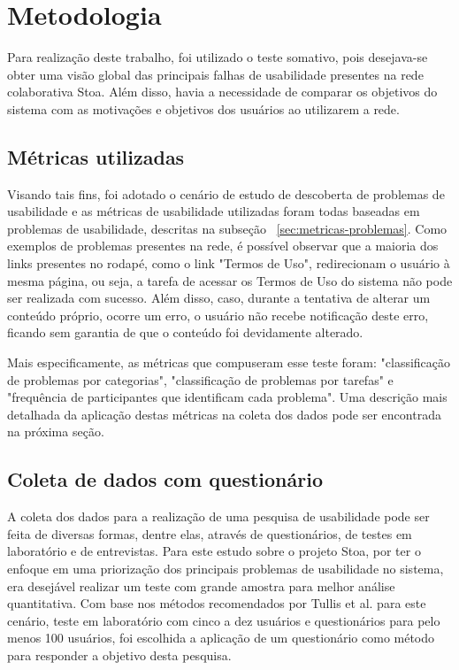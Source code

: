 \chapter{Metodologia}
\label{cap:metodologia}

	Para realização deste trabalho, foi utilizado o teste somativo, pois desejava-se obter uma visão global das principais falhas de usabilidade presentes na rede colaborativa Stoa. Além disso, havia a necessidade de comparar os objetivos do sistema com as motivações e objetivos dos usuários ao utilizarem a rede. 

\section{Métricas utilizadas}
\label{sec:metricas-usadas}

	Visando tais fins, foi adotado o cenário de estudo de descoberta de problemas de usabilidade \cite{tullis:13} e as métricas de usabilidade utilizadas foram todas baseadas em problemas de usabilidade, descritas na subseção ~\ref{sec:metricas-problemas}. Como exemplos de problemas presentes na rede, é possível observar que a maioria dos links presentes no rodapé, como o link "Termos de Uso", redirecionam o usuário à mesma página, ou seja, a tarefa de acessar os Termos de Uso do sistema não pode ser realizada com sucesso. Além disso, caso, durante a tentativa de alterar um conteúdo próprio, ocorre um erro, o usuário não recebe notificação deste erro, ficando sem garantia de que o conteúdo foi devidamente alterado.

 Mais especificamente, as métricas que compuseram esse teste foram: "classificação de problemas por categorias", "classificação de problemas por tarefas" e "frequência de participantes que identificam cada problema". Uma descrição mais detalhada da aplicação destas métricas na coleta dos dados pode ser encontrada na próxima seção.
	
\section{Coleta de dados com questionário}
\label{sec:coleta-dados}

	A coleta dos dados para a realização de uma pesquisa de usabilidade pode ser feita de diversas formas, dentre elas, através de questionários, de testes em laboratório e de entrevistas. Para este estudo sobre o projeto Stoa, por ter o enfoque em uma priorização dos principais problemas de usabilidade no sistema, era desejável realizar um teste com grande amostra para melhor análise quantitativa. Com base nos métodos recomendados por Tullis et al.\cite{tullis:13} para este cenário, teste em laboratório com cinco a dez usuários e questionários para pelo menos 100 usuários, foi escolhida a aplicação de um questionário como método para responder a objetivo desta pesquisa.
	
